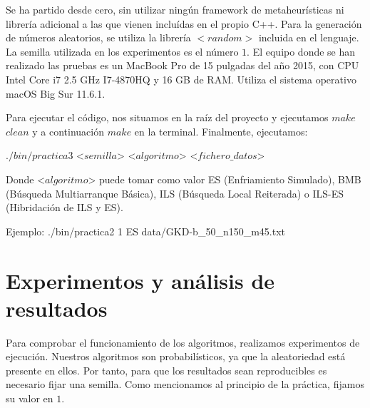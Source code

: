
Se ha partido desde cero, sin utilizar ningún framework de metaheurísticas ni librería adicional a las que vienen incluídas en el propio C++. Para la generación de números aleatorios, se utiliza la librería $<random>$ incluida en el lenguaje. La semilla utilizada en los experimentos es el número $1$. El equipo donde se han realizado las pruebas es un MacBook Pro de 15 pulgadas del año 2015, con CPU Intel Core i7 2.5 GHz I7-4870HQ y 16 GB de RAM. Utiliza el sistema operativo macOS Big Sur 11.6.1.

Para ejecutar el código, nos situamos en la raíz del proyecto y ejecutamos $make$ $clean$ y a continuación $make$ en la terminal. Finalmente, ejecutamos:

\noindent $./bin/practica3$ <$semilla$> \space <$algoritmo$> \space <$fichero\_datos$>

\noindent Donde <$algoritmo$> \space puede tomar como valor ES (Enfriamiento Simulado), BMB (Búsqueda Multiarranque Básica), ILS (Búsqueda Local Reiterada) o ILS-ES (Hibridación de ILS y ES).

\noindent Ejemplo: ./bin/practica2 1 ES data/GKD-b\_50\_n150\_m45.txt


\part{Experimentos y análisis de resultados}
Para comprobar el funcionamiento de los algoritmos, realizamos experimentos de ejecución. Nuestros algoritmos son probabilísticos, ya que la aleatoriedad está presente en ellos. Por tanto, para que los resultados sean reproducibles es necesario fijar una semilla. Como mencionamos al principio de la práctica, fijamos su valor en $1$. 

